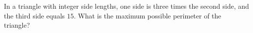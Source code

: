 In a triangle with integer side lengths, one side is three times the second side, and the third side equals $15$. What is the maximum possible perimeter of the triangle?
